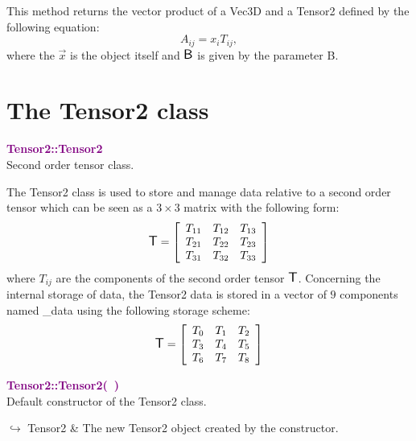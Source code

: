 This method returns the vector product of a Vec3D and a Tensor2 defined by the following equation:
\begin{equation*}
A_{ij} = x_i T_{ij},
\end{equation*}
where the $\overrightarrow{x}$ is the object itself and $\mbox{\large\ensuremath{\mathsf{B}}}$ is given by the parameter B.

\section{The Tensor2 class}

\textcolor{purple}{\textbf{Tensor2::Tensor2}}\label{Tensor2::Tensor2}\\
Second order tensor class.

The Tensor2 class is used to store and manage data relative to a second order tensor which can be seen as a $3\times3$ matrix with the following form:
\begin{equation*}
\mbox{\large\ensuremath{\mathsf{T}}}=\left[\begin{array}{ccc}
  T_{11} & T_{12} & T_{13}\\
  T_{21} & T_{22} & T_{23}\\
  T_{31} & T_{32} & T_{33}
  \end{array}\right]
\end{equation*}
where $T_{ij}$ are the components of the second order tensor $\mbox{\large\ensuremath{\mathsf{T}}}$.
Concerning the internal storage of data, the Tensor2 data is stored in a vector of $9$ components named \textsf{\_data} using the following storage scheme:
\begin{equation*}
\mbox{\large\ensuremath{\mathsf{T}}}=\left[\begin{array}{ccc}
    T_{0} & T_{1} & T_{2}\\
    T_{3} & T_{4} & T_{5}\\
    T_{6} & T_{7} & T_{8}
    \end{array}\right]
\end{equation*}

\textcolor{purple}{\textbf{Tensor2::Tensor2(~)}}\label{Tensor2::Tensor2()}\\
Default constructor of the Tensor2 class.\vspace*{-0.5em}
\begin{tcolorbox}[grow to left by=-1cm, width=\textwidth-1cm,myArgs,tabularx={l|R}]
$\hookrightarrow$ Tensor2 & The new Tensor2 object created by the constructor.
\end{tcolorbox}

